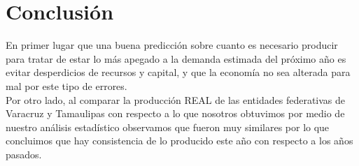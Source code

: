 \newpage
\section*{Conclusión}
En primer lugar que una buena predicción sobre cuanto es necesario producir para tratar de estar lo más apegado a la demanda estimada del próximo año es evitar desperdicios de recursos y capital, y que la economía no sea alterada para mal por este tipo de errores. \\
Por otro lado, al comparar la producción REAL de las entidades federativas de Varacruz y Tamaulipas con respecto a lo que nosotros obtuvimos por medio de nuestro análisis estadístico observamos que fueron muy similares por lo que concluimos que hay consistencia de lo producido este año con respecto a los años pasados. 



